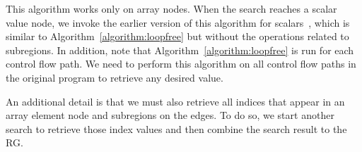 This algorithm works only on array nodes.
When the search reaches a scalar value node, we invoke the earlier version of this algorithm for scalars~\cite{Hou2012}, which is similar to Algorithm~\ref{algorithm:loopfree} but without the operations related to subregions.
In addition, note that Algorithm~\ref{algorithm:loopfree} is run for each control flow path.
We need to perform this algorithm on all control flow paths in the original program to retrieve any desired value.


An additional detail is that we must also retrieve all indices that appear in an array element node and subregions on the edges.
To do so, we start another search to retrieve those index values and then combine the search result to the RG.
 

